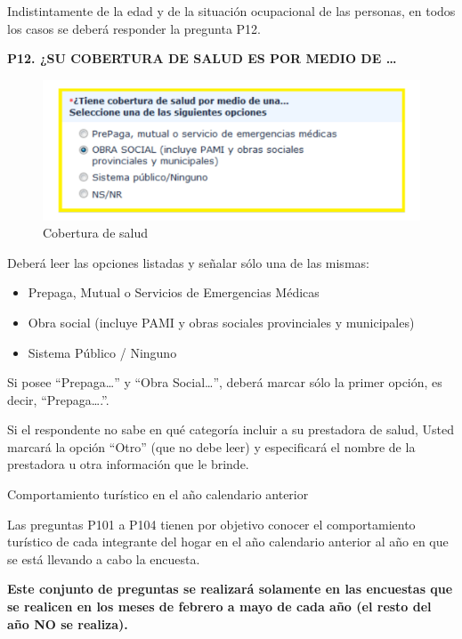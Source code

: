 \documentclass[
  openany]{book}
\begin{document}
Indistintamente de la edad y de la situación ocupacional de las personas, en todos los casos se deberá responder la pregunta P12.

\textbf{P12. ¿SU COBERTURA DE SALUD ES POR MEDIO DE \ldots{}}

\begin{figure}

{\centering \includegraphics[width=1\linewidth]{imagenes/figura6-59} 

}

\caption{Cobertura de salud}\label{fig:coberturasalud}
\end{figure}

Deberá leer las opciones listadas y señalar sólo una de las mismas:

\begin{itemize}
\item
  Prepaga, Mutual o Servicios de Emergencias Médicas
\item
  Obra social (incluye PAMI y obras sociales provinciales y municipales)
\item
  Sistema Público / Ninguno
\end{itemize}

Si posee ``Prepaga\ldots{}'' y ``Obra Social\ldots{}'', deberá marcar sólo la primer opción, es decir, ``Prepaga\ldots.''.

Si el respondente no sabe en qué categoría incluir a su prestadora de salud, Usted marcará la opción ``Otro'' (que no debe leer) y especificará el nombre de la prestadora u otra información que le brinde.

Comportamiento turístico en el año calendario anterior

Las preguntas P101 a P104 tienen por objetivo conocer el comportamiento turístico de cada integrante del hogar en el año calendario anterior al año en que se está llevando a cabo la encuesta.

\textbf{Este conjunto de preguntas se realizará solamente en las encuestas que se realicen en los meses de febrero a mayo de cada año (el resto del año NO se realiza).}
\end{document}
